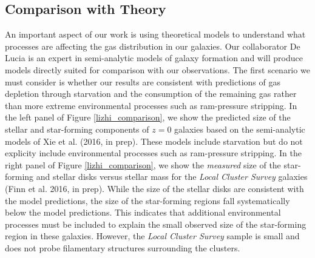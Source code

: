 \documentclass[11pt, preprint]{aastex}
\begin{document}
{\subsection{Comparison with Theory}
\vspace*{-.4cm}

An important aspect of our work is using theoretical models to understand what processes are affecting the gas distribution in our galaxies.  Our collaborator De Lucia is an expert in semi-analytic models of galaxy formation and will produce models directly suited for comparison with our observations.  The first scenario we must consider is whether our results are
consistent with predictions of gas depletion through starvation and
the consumption of the remaining gas
rather than more extreme environmental processes such as ram-pressure stripping.
In the left panel of Figure \ref{lizhi_comparison}, we show the predicted size of the
stellar and star-forming components of $z = 0$ galaxies based on the
semi-analytic models of Xie et al. (2016, in prep).  These models
include starvation but do not explicity include environmental
processes such as ram-pressure stripping.  In the right panel of
Figure \ref{lizhi_comparison}, we show the {\it measured} size of the
star-forming and stellar disks versus stellar mass for the {\it Local
  Cluster Survey} galaxies (Finn et al. 2016, in prep).  While the size of the stellar disks are
consistent with the model predictions, the size of the star-forming
regions fall systematically below the model predictions.  This
indicates that additional environmental processes must be included to
explain the small observed size of the star-forming region in these
galaxies.  However, the {\it Local Cluster Survey} sample is small and does not probe filamentary structures surrounding the clusters.



}
\end{document}
